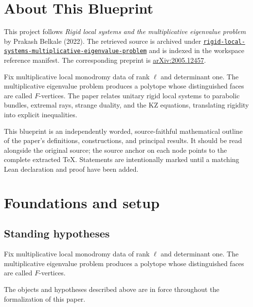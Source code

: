 

\chapter*{About This Blueprint}
\label{rigid-local-systems-multiplicative-eigenvalue-problem-about}

This project follows \emph{Rigid local systems and the multiplicative eigenvalue problem} by Prakash Belkale (2022). The
retrieved source is archived under
\href{../../../../../references/rigid-local-systems-multiplicative-eigenvalue-problem/}{\texttt{rigid-local-systems-multiplicative-eigenvalue-problem}} and is indexed in
the workspace reference manifest. The corresponding preprint is
\href{https://arxiv.org/abs/2005.12457}{arXiv:2005.12457}.

Fix multiplicative local monodromy data of rank $\ell$ and determinant one. The multiplicative eigenvalue problem produces a polytope whose distinguished faces are called $F$-vertices. The paper relates unitary rigid local systems to parabolic bundles, extremal rays, strange duality, and the KZ equations, translating rigidity into explicit inequalities.

This blueprint is an independently worded, source-faithful mathematical
outline of the paper's definitions, constructions, and principal results. It
should be read alongside the original source; the source anchor on each node
points to the complete extracted TeX. Statements are intentionally marked
\notready until a matching Lean declaration and proof have been added.

\chapter{Foundations and setup}
\label{chap:rigid-local-systems-multiplicative-eigenvalue-problem-foundations}

\section{Standing hypotheses}
\label{sec:rigid-local-systems-multiplicative-eigenvalue-problem-standing}

Fix multiplicative local monodromy data of rank $\ell$ and determinant one. The multiplicative eigenvalue problem produces a polytope whose distinguished faces are called $F$-vertices.

\begin{convention}
\label{rigid-local-systems-multiplicative-eigenvalue-problem-setup}
The objects and hypotheses described above are in force throughout the
formalization of this paper.
\notready
\end{convention}

